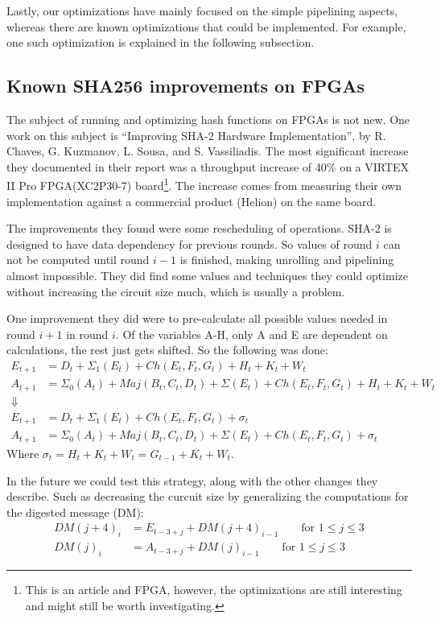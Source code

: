 \documentclass[a4paper, openany]{book}
\begin{document}
Lastly, our optimizations have mainly focused on the simple pipelining aspects, whereas there are known optimizations that could be implemented.
For example, one such optimization is explained in the following subsection.
\subsection{Known SHA256 improvements on FPGAs}
\label{sec:org8aa16f6}
\label{sec:SHAimprovements}
The subject of running and optimizing hash functions on FPGAs is not new. One work on this subject is ``Improving SHA-2 Hardware Implementation'', by R. Chaves, G. Kuzmanov, L. Sousa, and S. Vassiliadis.
The most significant increase they documented in their report was a throughput increase of 40\% on a VIRTEX II Pro FPGA(XC2P30-7) board\footnote{This is an article and FPGA, however, the optimizations are still interesting and might still be worth investigating.}.
The increase comes from measuring their own implementation against a commercial product (Helion) on the same board.

The improvements they found were some rescheduling of operations. SHA-2 is designed to have data dependency for previous rounds.
So values of round \(i\) can not be computed until round \(i-1\) is finished, making unrolling and pipelining almost impossible.
They did find some values and techniques they could optimize without increasing the circuit size much, which is usually a problem.

One improvement they did were to pre-calculate all possible values needed in round \(i+1\) in round \(i\).
Of the variables A-H, only A and E are dependent on calculations, the rest just gets shifted. So the following was done:
\begin{align}
E_{t+1} &= D_t+\Sigma_1(E_t)+Ch(E_t,F_t,G_t)+H_t+K_t+W_t\\
A_{t+1} &= \Sigma_0(A_t)+Maj(B_t,C_t,D_t)+\Sigma(E_t)+Ch(E_t,F_t,G_t)+H_t+K_t+W_t\\
\Downarrow\\
E_{t+1} &= D_t+\Sigma_1(E_t)+Ch(E_t,F_t,G_t)+\sigma_t\\
A_{t+1} &= \Sigma_0(A_t)+Maj(B_t,C_t,D_t)+\Sigma(E_t)+Ch(E_t,F_t,G_t)+\sigma_t
\end{align}
Where \(\sigma_t = H_t + K_t + W_t = G_{t-1} + K_t + W_t\).

In the future we could test this strategy, along with the other changes they describe. Such as decreasing the curcuit size by generalizing the computations for the digested message (DM):
\begin{align}
DM(j+4)_i &= E_{t-3+j} + DM(j+4)_{i-1}\qquad \text{for } 1\leq j \leq 3\\
DM(j)_i &= A_{t-3+j} + DM(j)_{i-1}\qquad \text{for } 1\leq j \leq 3
\end{align}
\end{document}
